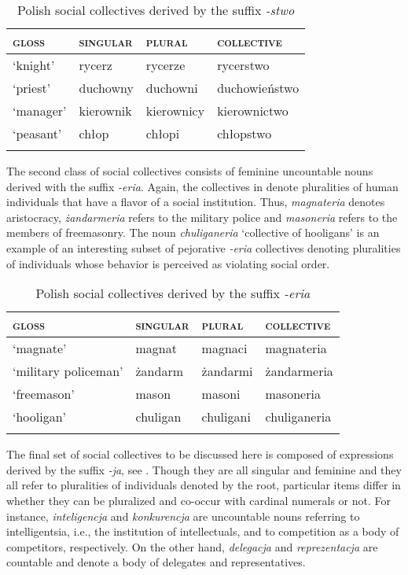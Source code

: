 \documentclass[output=paper]{langscibook}
\begin{document}
\begin{table}[h!]
\caption{Polish social collectives derived by the suffix \textit{-stwo}} 
\label{wan:tab:rycerstwo}
 \begin{tabular}{llll} 
  \lsptoprule
           \textsc{gloss} & \textsc{singular} & \textsc{plural} & \textsc{collective} \\ 
  \midrule
  `knight'  &   rycerz &    rycerze  &    rycerstwo \\
  `priest'  &   duchowny &   duchowni &    duchowieństwo \\
  `manager'  &   kierownik &   kierownicy &    kierownictwo \\
  `peasant'  &   chłop &   chłopi &    chłopstwo \\
  \lspbottomrule
 \end{tabular}
\end{table}

The second class of social collectives consists of feminine uncountable nouns derived with the suffix \textit{-eria}. Again, the collectives in  denote pluralities of human individuals that have a flavor of a social institution. Thus, \textit{magnateria} denotes aristocracy, \textit{żandarmeria} refers to the military police and \textit{masoneria} refers to the members of freemasonry. The noun \textit{chuliganeria} `collective of hooligans' is an example of an interesting subset of pejorative \textit{-eria} collectives denoting pluralities of individuals whose behavior is perceived as violating social order.\largerpage

\begin{table}[h!]
\caption{Polish social collectives derived by the suffix \textit{-eria}} 
\label{wan:tab:magnateria}
 \begin{tabular}{llll} 
  \lsptoprule
          \textsc{gloss}  & \textsc{singular} & \textsc{plural} & \textsc{collective} \\ 
  \midrule
  `magnate'  &   magnat &    magnaci  &    magnateria \\
  `military policeman'  &   żandarm &   żandarmi &    żandarmeria \\
  `freemason'  &   mason &   masoni &    masoneria \\
  `hooligan'  &   chuligan &   chuligani &    chuliganeria \\
  \lspbottomrule
 \end{tabular}
\end{table}

The final set of social collectives to be discussed here is composed of expressions derived by the suffix \textit{-ja}, see . Though they are all singular and feminine and they all refer to pluralities of individuals denoted by the root, particular items differ in whether they can be pluralized and co-occur with cardinal numerals or not. For instance, \textit{inteligencja} and \textit{konkurencja} are uncountable nouns referring to intelligentsia, i.e., the institution of intellectuals, and to competition as a body of competitors, respectively. On the other hand, \textit{delegacja} and \textit{reprezentacja} are countable and denote a body of delegates and representatives.
\end{document}
